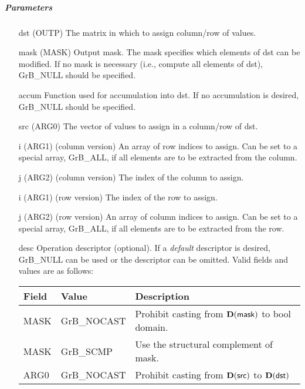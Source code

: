 \subparagraph{Parameters}

\begin{itemize}[leftmargin=1.1in]
    \item[{\sf dst}]   ({\sf OUTP}) The matrix in which to assign column/row of values.

    \item[{\sf mask}] ({\sf MASK}) Output mask. The mask specifies which elements
    of {\sf dst} can be modified. If no mask is necessary (i.e., compute all
    elements of {\sf dst}), {\sf GrB\_NULL} should be specified.

    \item[{\sf accum}] Function used for accumulation into {\sf dst}.  If no accumulation
                        is desired, {\sf GrB\_NULL} should be specified.

    \item[{\sf src}]   ({\sf ARG0}) The vector of values to assign in a column/row of dst.

    \item[{\sf i}]     ({\sf ARG1}) (column version) An array of row indices to assign. Can
                              be set to a special array, {\sf GrB\_ALL}, if all elements
                              are to be extracted from the column.
    \item[{\sf j}]     ({\sf ARG2}) (column version) The index of the column to assign.

    \item[{\sf i}]     ({\sf ARG1}) (row version) The index of the row to assign.
    \item[{\sf j}]     ({\sf ARG2}) (row version) An array of column indices to assign. Can
                              be set to a special array, {\sf GrB\_ALL}, if all elements
                              are to be extracted from the row.


    \item[{\sf desc}]   Operation descriptor (optional). If a
    \emph{default} descriptor is desired, {\sf GrB\_NULL} can be
    used or the descriptor can be omitted.  Valid fields and values are as follows: \\
    \begin{tabular}{lll}
    Field  & Value & Description \\
    \hline
    {\sf MASK} & {\sf GrB\_NOCAST} & Prohibit casting from $\bold{D}({\sf mask})$ to {\sf bool} domain. \\
    {\sf MASK} & {\sf GrB\_SCMP} & Use the structural complement of {\sf mask}. \\
    {\sf ARG0} & {\sf GrB\_NOCAST} & Prohibit casting from $\bold{D}({\sf src})$ to $\bold{D}({\sf dst})$ \\
    \end{tabular}

\end{itemize}

